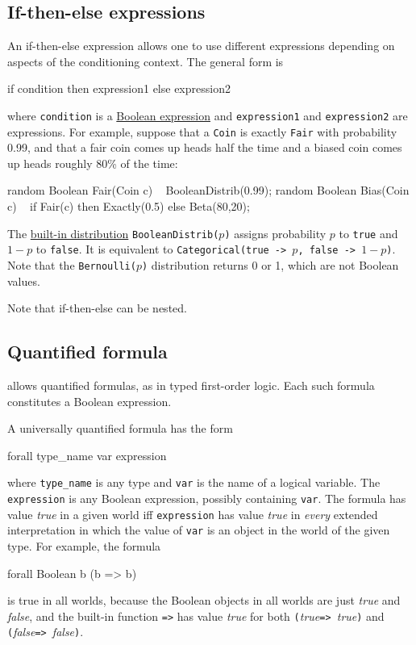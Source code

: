 \documentclass[12pt]{article}
\begin{document}
\subsection{If-then-else expressions}\label{if-then-else-section}

An if-then-else expression allows one to use different expressions depending on aspects of the conditioning context.
The general form is
\begin{blogcode}
if condition then expression1 else expression2
\end{blogcode}
where \texttt{condition} is a \hyperref[Boolean-expression-section]{Boolean expression} and \texttt{expression1} and \texttt{expression2}
are expressions. For example, suppose that a {\tt Coin} is exactly {\tt Fair} with probability 0.99, and that
a fair coin comes up heads half the time and a biased coin comes up heads roughly 80\% of the time:
\begin{blogcode}
random Boolean Fair(Coin c) ~ BooleanDistrib(0.99);
random Boolean Bias(Coin c) ~  
  if Fair(c) then Exactly(0.5) 
  else Beta(80,20);
\end{blogcode}
The \hyperref[builtin-distribution-appendix]{built-in distribution}
{\tt BooleanDistrib($p$)} assigns probability $p$ to {\tt true} and
$1-p$ to {\tt false}. It is equivalent to {\tt Categorical({true ->
    $p$, false -> $1-p$})}. Note that the {\tt Bernoulli($p$)}
distribution returns 0 or 1, which are not Boolean values. 

Note that if-then-else can be nested. 



\subsection{Quantified formula}\label{quantifier-section}
\bl allows quantified formulas, as in typed first-order logic. 
Each such formula constitutes a Boolean expression.

A universally quantified formula has the form
\begin{blogcode}
forall type_name var expression
\end{blogcode}
where {\tt type\_name} is any type and {\tt var} is the name of a
logical variable. The {\tt expression} is any Boolean expression,
possibly containing {\tt var}. The formula has value {\it true}
in a given world iff {\tt expression} has value {\it true}
in {\em every} extended interpretation in which the value of {\tt var} 
is an object in the world of the given type. For example, the formula
\begin{blogcode}
forall Boolean b (b => b)
\end{blogcode}
is true in all worlds, because the Boolean objects in all worlds are 
just {\it true} and {\it false}, and the built-in function {\tt =>}
has value {\it true} for both {\tt (}{\it true}{\tt => }{\it true}{\tt )}
and {\tt (}{\it false}{\tt => }{\it false}{\tt )}.
\end{document}

